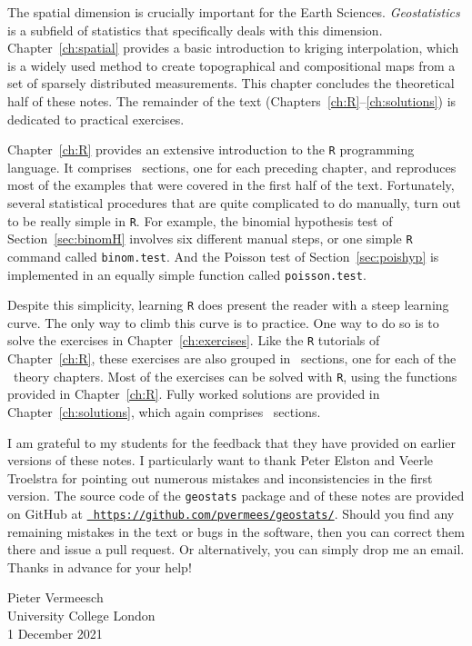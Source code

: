 The spatial dimension is crucially important for the Earth
Sciences. \emph{Geostatistics} is a subfield of statistics that
specifically deals with this dimension. Chapter~\ref{ch:spatial}
provides a basic introduction to kriging interpolation, which is a
widely used method to create topographical and compositional maps from
a set of sparsely distributed measurements. This chapter concludes the
theoretical half of these notes. The remainder of the text
(Chapters~\ref{ch:R}--\ref{ch:solutions}) is dedicated to practical
exercises.\medskip

Chapter~\ref{ch:R} provides an extensive introduction to the
\texttt{R} programming language. It comprises \nch~sections, one for
each preceding chapter, and reproduces most of the examples that were
covered in the first half of the text. Fortunately, several
statistical procedures that are quite complicated to do manually, turn
out to be really simple in \texttt{R}. For example, the binomial
hypothesis test of Section~\ref{sec:binomH} involves six different
manual steps, or one simple \texttt{R} command called
\texttt{binom.test}. And the Poisson test of Section~\ref{sec:poishyp}
is implemented in an equally simple function called
\texttt{poisson.test}.\medskip

Despite this simplicity, learning \texttt{R} does present the reader
with a steep learning curve. The only way to climb this curve is to
practice. One way to do so is to solve the exercises in
Chapter~\ref{ch:exercises}. Like the \texttt{R} tutorials of
Chapter~\ref{ch:R}, these exercises are also grouped in \nch~sections,
one for each of the \nch~theory chapters. Most of the exercises can be
solved with \texttt{R}, using the functions provided in
Chapter~\ref{ch:R}. Fully worked solutions are provided in
Chapter~\ref{ch:solutions}, which again comprises \nch~sections.\medskip

I am grateful to my students for the feedback that they have provided
on earlier versions of these notes.  I particularly want to thank
Peter Elston and Veerle Troelstra for pointing out numerous mistakes
and inconsistencies in the first version. The source code of the
\texttt{geostats} package and of these notes are provided on GitHub at
\href{https://github.com/pvermees/geostats/}{\tt
  https://github.com/pvermees/geostats/}.  Should you find any
remaining mistakes in the text or bugs in the software, then you can
correct them there and issue a pull request. Or alternatively, you can
simply drop me an email. Thanks in advance for your help!\medskip

\begin{flushright}
  Pieter Vermeesch\\ University College London\\ 1 December 2021
\end{flushright}
